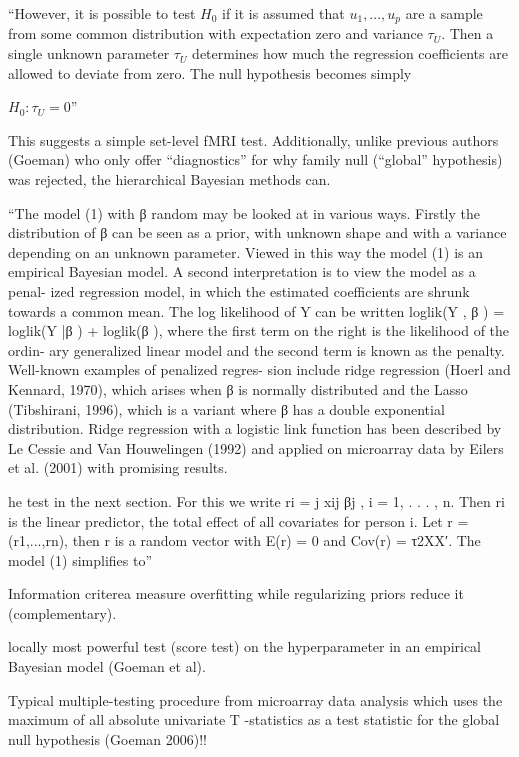 \documentclass{article}
\begin{document}
``However, it is possible to test $H_0$ if it is assumed that $u_1, ..., u_p$ are a sample from some common distribution with expectation zero and variance $\tau_U$. Then a single unknown parameter $\tau_U$ determines how much the regression coefficients are allowed to deviate from zero. The null hypothesis becomes simply

$H_0: \tau_U = 0$''

This suggests a simple set-level fMRI test. Additionally, unlike previous authors (Goeman) who only offer ``diagnostics'' for why family null (``global'' hypothesis) was rejected, the hierarchical Bayesian methods can. 

``The model (1) with β random may be looked at in various ways. Firstly the distribution of β can be seen as a prior, with unknown shape and with a variance depending on an unknown parameter. Viewed in this way the model (1) is an empirical Bayesian model.
A second interpretation is to view the model as a penal- ized regression model, in which the estimated coefficients are shrunk towards a common mean. The log likelihood of Y can be written
loglik(Y , β ) = loglik(Y |β ) + loglik(β ),
where the first term on the right is the likelihood of the ordin- ary generalized linear model and the second term is known as the penalty. Well-known examples of penalized regres- sion include ridge regression (Hoerl and Kennard, 1970), which arises when β is normally distributed and the Lasso (Tibshirani, 1996), which is a variant where β has a double exponential distribution. Ridge regression with a logistic link function has been described by Le Cessie and Van Houwelingen (1992) and applied on microarray data by Eilers et al. (2001) with promising results.

he test in the next section. For this we write ri = j xij βj , i = 1, . . . , n. Then ri is the linear predictor, the total effect of all covariates for person i. Let r = (r1,...,rn), then r is a random vector with E(r) = 0 and Cov(r) = τ2XX′. The model (1) simplifies to''

Information criterea measure overfitting while regularizing priors reduce it (complementary).

locally most powerful test (score test) on the hyperparameter in an empirical Bayesian model (Goeman et al).

Typical multiple-testing procedure from microarray data analysis which uses the maximum of all absolute univariate T -statistics as a test statistic for the global null hypothesis (Goeman 2006)!!
\end{document}
